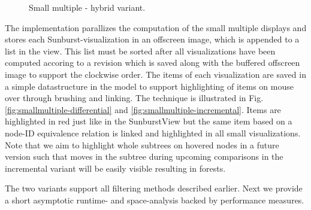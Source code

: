 \begin{itemize}
\begin{figure}[tb]
\caption{\label{fig:wikipedia-smallmultiples-hybrid} Small multiple - hybrid variant.}
\end{figure}
\end{itemize}

The implementation parallizes the computation of the small multiple displays and stores each Sunburst-visualization in an offscreen image, which is appended to a list in the view. This list must be sorted after all visualizations have been computed accoring to a revision which is saved along with the buffered offscreen image to support the clockwise order. The items of each visualization are saved in a simple datastructure in the model to support highlighting of items on mouse over through brushing and linking. The technique is illustrated in Fig. \ref{fig:smallmultiple-differential} and \ref{fig:smallmultiple-incremental}. Items are highlighted in red just like in the SunburstView but the same item based on a node-ID equivalence relation is linked and highlighted in all small visualizations. Note that we aim to highlight whole subtrees on hovered nodes in a future version such that moves in the subtree during upcoming comparisons in the incremental variant will be easily visible resulting in forests. 

The two variants support all filtering methods described earlier. Next we provide a short asymptotic runtime- and space-analysis backed by performance measures.

